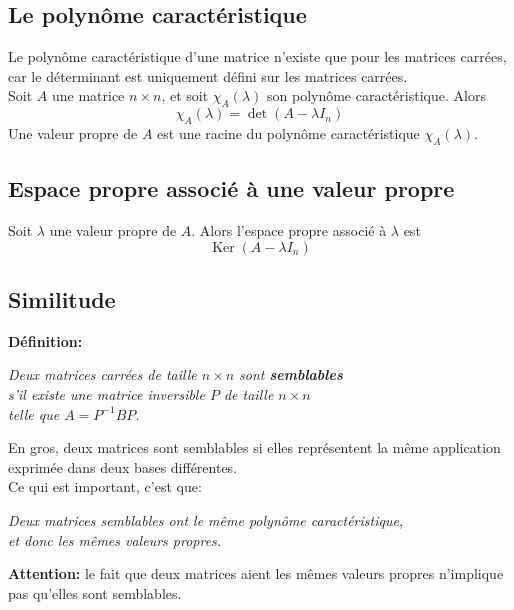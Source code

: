 \documentclass{article}
\DeclareMathOperator{\ke}{Ker}
\begin{document}
\subsection{Le polynôme caractéristique}
Le polynôme caractéristique d'une matrice n'existe que pour les matrices carrées, car le déterminant est uniquement défini sur les matrices carrées. \\
Soit \(A\) une matrice \(n \times n\), et soit \(\chi_A(\lambda)\) son polynôme caractéristique. Alors
\begin{equation}
	\chi_A(\lambda) = \det(A-\lambda I_n)
\end{equation}
Une valeur propre de \(A\) est une racine du polynôme caractéristique \(\chi_A(\lambda)\). 

\subsection{Espace propre associé à une valeur propre}
Soit \(\lambda\) une valeur propre de \(A\). Alors l'espace propre associé à \(\lambda\) est
\begin{equation}
	\ke(A-\lambda I_n)
\end{equation}

\subsection{Similitude}
\textbf{Définition:}
\begin{center}
	\emph{Deux matrices carrées de taille \(n \times n\) sont \textbf{semblables} \\ s'il existe une matrice inversible \(P\) de taille \(n \times n\) \\ telle que \(A = P^{-1}BP\).}
\end{center}

En gros, deux matrices sont semblables si elles représentent la même application exprimée dans deux bases différentes. \\
Ce qui est important, c'est que:
\begin{center}
	\emph{Deux matrices semblables ont le même polynôme caractéristique, \\ et donc les mêmes valeurs propres.}
\end{center}
\textbf{Attention:} le fait que deux matrices aient les mêmes valeurs propres n'implique pas qu'elles sont semblables.
\end{document}
